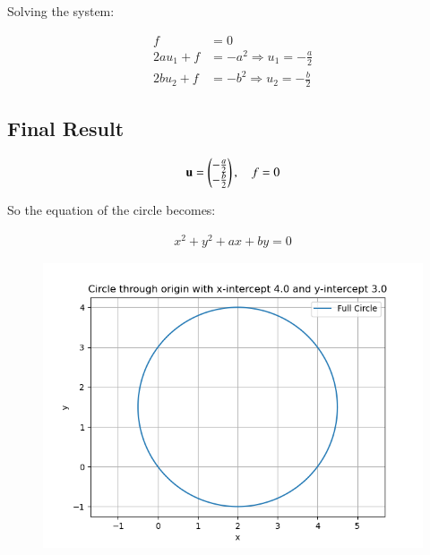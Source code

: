 \documentclass{article}
\begin{document}
Solving the system:

\begin{align*}
f &= 0 \\
2a u_1 + f &= -a^2 \Rightarrow u_1 = -\frac{a}{2} \\
2b u_2 + f &= -b^2 \Rightarrow u_2 = -\frac{b}{2}
\end{align*}

\subsection*{Final Result}

\begin{align}
\mathbf{u} = \begin{pmatrix} -\frac{a}{2} \\ -\frac{b}{2} \end{pmatrix}, \quad f = 0
\end{align}


So the equation of the circle becomes:


\begin{align}
x^2 + y^2 + ax + by = 0
\end{align}


\begin{figure}[H]
    \centering
    \includegraphics[width=0.7\linewidth]{./figs/Figure_1.png}
    \caption{}
    \label{fig:fig1}
\end{figure}
\end{document}
